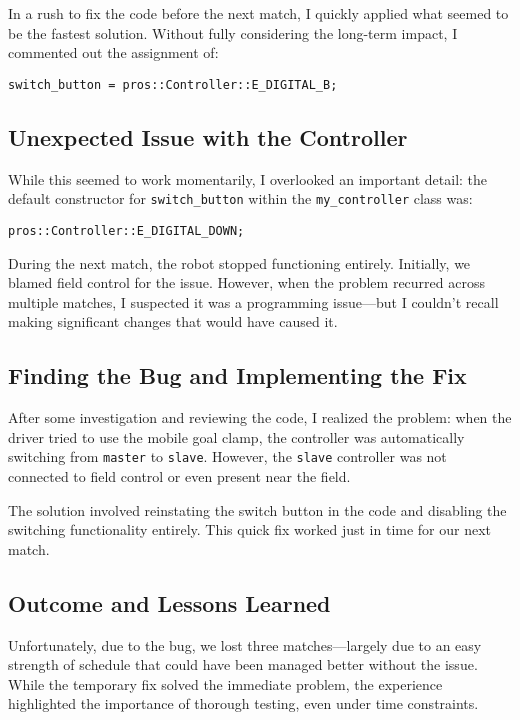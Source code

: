 In a rush to fix the code before the next match, I quickly applied what seemed to be the fastest solution. Without fully considering the long-term impact, I commented out the assignment of:
\begin{verbatim}
switch_button = pros::Controller::E_DIGITAL_B;
\end{verbatim}
\subsection*{Unexpected Issue with the Controller}
While this seemed to work momentarily, I overlooked an important detail: the default constructor for \texttt{switch\_button} within the \texttt{my\_controller} class was:
\begin{verbatim}
pros::Controller::E_DIGITAL_DOWN;
\end{verbatim}

During the next match, the robot stopped functioning entirely. Initially, we blamed field control for the issue. However, when the problem recurred across multiple matches, I suspected it was a programming issue—but I couldn’t recall making significant changes that would have caused it.

\subsection*{Finding the Bug and Implementing the Fix}
After some investigation and reviewing the code, I realized the problem: when the driver tried to use the mobile goal clamp, the controller was automatically switching from \texttt{master} to \texttt{slave}. However, the \texttt{slave} controller was not connected to field control or even present near the field.

The solution involved reinstating the switch button in the code and disabling the switching functionality entirely. This quick fix worked just in time for our next match.

\subsection*{Outcome and Lessons Learned}
Unfortunately, due to the bug, we lost three matches—largely due to an easy strength of schedule that could have been managed better without the issue. While the temporary fix solved the immediate problem, the experience highlighted the importance of thorough testing, even under time constraints.

